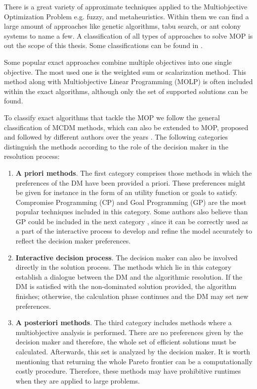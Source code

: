 There is a great variety of approximate techniques applied to the Multiobjective Optimization Problem e.g. fuzzy, and metaheuristics. Within them we can find a large amount of approaches like genetic algorithms, tabu search, or ant colony systems to name a few. A classification of all types of approaches to solve MOP is out the scope of this thesis. Some classifications can be found in \citep{Ehrgott2000,ehrgott2005,Branke2008}.   

Some popular exact approaches combine multiple objectives into one single objective. The most used one is the weighted sum or scalarization method. This method along with Multiobjective Linear Programming (MOLP) is often included within the exact algorithms, although only the set of supported solutions can be found. 

To classify exact algorithms that tackle the MOP we follow the general classification of MCDM methods, which can also be extended to MOP, proposed and followed by different authors over the years \citep{cohon1978,climacopascoal2012}. The following categories distinguish the methods according to the role of the decision maker in the resolution process: 

\begin{enumerate}
	\item \textbf{A priori methods}. The first category comprises those methods in which the preferences of the DM have been provided a priori. These preferences might be given for instance in the form of an utility function or goals to satisfy. Compromise Programming (CP) and Goal Programming (GP) are the most popular techniques included in this category. Some authors also believe than GP could be included in the next category \citep{Jones2010}, since it can be correctly used as a part of the interactive process to develop and refine the model accurately to reflect the decision maker preferences. 
	\item \textbf{Interactive decision process}. The decision maker can also be involved directly in the solution process. The methods which lie in this category establish a dialogue between the DM and the algorithmic resolution. If the DM is satisfied with the non-dominated solution provided, the algorithm finishes; otherwise, the calculation phase continues and the DM may set new preferences.
	\item \textbf{A posteriori methods}. The third category includes methods where a multiobjective analysis is performed. There are no preferences given by the decision maker and therefore, the whole set of efficient solutions must be calculated. Afterwards, this set is analyzed by the decision maker. It is worth mentioning that returning the whole Pareto frontier can be a computationally costly procedure. Therefore, these methods may have prohibitive runtimes when they are applied to large problems.
 
\end{enumerate}

